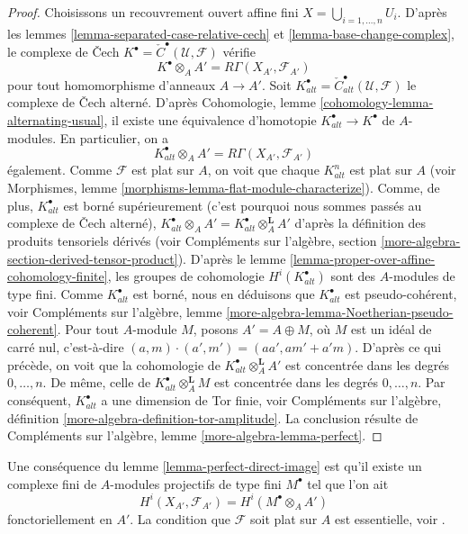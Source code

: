 \begin{proof}
Choisissons un recouvrement ouvert affine fini $X = \bigcup_{i = 1, \ldots, n} U_i$.
D'après les lemmes \ref{lemma-separated-case-relative-cech} et
\ref{lemma-base-change-complex}, le complexe de {\v C}ech
$K^\bullet = {\check C}^\bullet(\mathcal{U}, \mathcal{F})$ vérifie
$$
K^\bullet \otimes_A A' = R\Gamma(X_{A'}, \mathcal{F}_{A'})
$$
pour tout homomorphisme d'anneaux $A \to A'$. Soit
$K_{alt}^\bullet = {\check C}_{alt}^\bullet(\mathcal{U}, \mathcal{F})$
le complexe de {\v C}ech alterné. D'après
Cohomologie, lemme \ref{cohomology-lemma-alternating-usual},
il existe une équivalence d'homotopie $K_{alt}^\bullet \to K^\bullet$
de $A$-modules. En particulier, on a
$$
K_{alt}^\bullet \otimes_A A' = R\Gamma(X_{A'}, \mathcal{F}_{A'})
$$
également. Comme $\mathcal{F}$ est plat sur $A$, on voit que chaque $K_{alt}^n$
est plat sur $A$ (voir
Morphismes, lemme \ref{morphisms-lemma-flat-module-characterize}).
Comme, de plus, $K_{alt}^\bullet$ est borné supérieurement (c'est pourquoi nous sommes passés
au complexe de {\v C}ech alterné),
$K_{alt}^\bullet \otimes_A A' = K_{alt}^\bullet \otimes_A^{\mathbf{L}} A'$
d'après la définition des produits tensoriels dérivés (voir
Compléments sur l'algèbre, section \ref{more-algebra-section-derived-tensor-product}).
D'après le
lemme \ref{lemma-proper-over-affine-cohomology-finite},
les groupes de cohomologie $H^i(K_{alt}^\bullet)$ sont des $A$-modules de
type fini. Comme $K_{alt}^\bullet$ est borné, nous en déduisons que $K_{alt}^\bullet$
est pseudo-cohérent, voir
Compléments sur l'algèbre, lemme \ref{more-algebra-lemma-Noetherian-pseudo-coherent}.
Pour tout $A$-module $M$, posons $A' = A \oplus M$, où $M$ est un idéal de carré
nul, c'est-à-dire $(a, m) \cdot (a', m') = (aa', am' + a'm)$. D'après ce qui précède,
on voit que la cohomologie de $K_{alt}^\bullet \otimes_A^\mathbf{L} A'$ est concentrée
dans les degrés $0, \ldots, n$. De même, celle de $K_{alt}^\bullet \otimes_A^\mathbf{L} M$
est concentrée dans les degrés $0, \ldots, n$. Par conséquent, $K_{alt}^\bullet$ a
une dimension de Tor finie,
voir Compléments sur l'algèbre, définition \ref{more-algebra-definition-tor-amplitude}.
La conclusion résulte de Compléments sur l'algèbre, lemme \ref{more-algebra-lemma-perfect}.
\end{proof}

\begin{remark}
\label{remark-explain-perfect-direct-image}
Une conséquence du lemme \ref{lemma-perfect-direct-image} est qu'il
existe un complexe fini de $A$-modules projectifs de type fini $M^\bullet$ tel
que l'on ait
$$
H^i(X_{A'}, \mathcal{F}_{A'}) = H^i(M^\bullet \otimes_A A')
$$
fonctoriellement en $A'$. La condition que $\mathcal{F}$ soit
plat sur $A$ est essentielle, voir \cite{Hartshorne}.
\end{remark}







